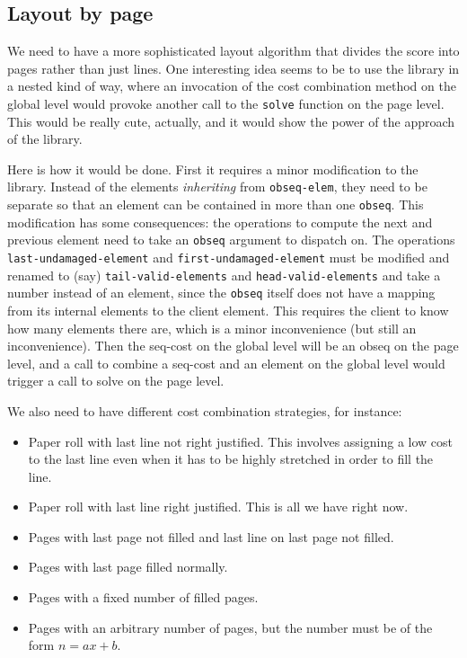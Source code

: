 \subsection{Layout by page}

We need to have a more sophisticated layout algorithm that divides the
score into pages rather than just lines.  One interesting idea seems
to be to use the {\obseq} library in a nested kind of way, where an
invocation of the cost combination method on the global level would
provoke another call to the \texttt{solve} function on the page
level.  This would be really cute, actually, and it would show the
power of the approach of the {\obseq} library.  

Here is how it would be done.  First it requires a minor modification
to the {\obseq} library.  Instead of the elements \emph{inheriting}
from \texttt{obseq-elem}, they need to be separate so that an element
can be contained in more than one \texttt{obseq}.  This modification
has some consequences: the operations to compute the next and previous
element need to take an \texttt{obseq} argument to dispatch on.  The
operations \texttt{last-undamaged-element} and
\texttt{first-undamaged-element} must be modified and renamed to (say)
\texttt{tail-valid-elements} and \texttt{head-valid-elements} and take
a number instead of an element, since the \texttt{obseq} itself does
not have a mapping from its internal elements to the client element.
This requires the client to know how many elements there are, which is
a minor inconvenience (but still an inconvenience). Then the seq-cost
on the global level will be an obseq on the page level, and a call to
combine a seq-cost and an element on the global level would trigger a
call to solve on the page level.

We also need to have different cost combination strategies, for
instance:

\begin{itemize}
\item Paper roll with last line not right justified.  This involves
  assigning a low cost to the last line even when it has to be highly
  stretched in order to fill the line.  
\item Paper roll with last line right justified.  This is all we have
  right now.
\item Pages with last page not filled and last line on last page not
  filled. 
\item Pages with last page filled normally.
\item Pages with a fixed number of filled pages.
\item Pages with an arbitrary number of pages, but the number must be
  of the form $n = ax + b$.
\end{itemize}


